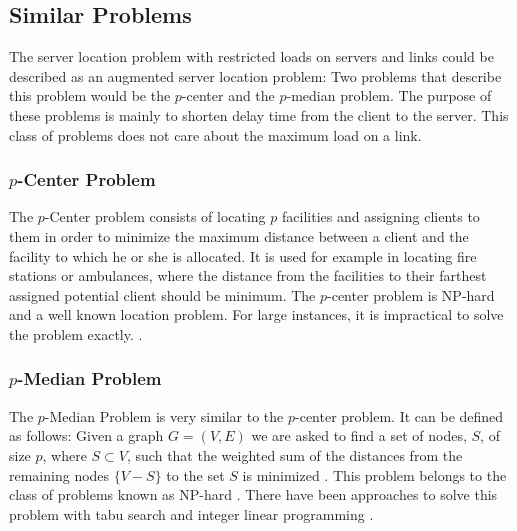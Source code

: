 \documentclass [12pt]{article}
\begin{document}
\subsection {Similar Problems}
The server location problem with restricted loads on servers and links could be described as an augmented server location problem: 
Two problems that describe this problem would be the $p$-center and the
$p$-median problem. The purpose of these problems is mainly to shorten delay
time from the client to the server. 
This class of problems does not care about the maximum load on a link.

\subsubsection {$p$-Center Problem}
The $p$-Center problem consists of locating $p$ facilities and assigning clients
to them in order to minimize the maximum distance between a client and the facility
to which he or she is allocated. It is used for example in locating fire stations or ambulances,
where the distance from the facilities 
to their farthest assigned potential client should be minimum.
The $p$-center problem is NP-hard and a well known location problem.
For large instances, it is impractical to solve the problem exactly.
\cite{KarivHakimi1979}.

\subsubsection {$p$-Median Problem}
The $p$-Median Problem is very similar to the $p$-center problem. It can be defined as follows:
Given a graph $G=(V,E)$ we are asked to find a set of nodes, $S$, of size $p$, where $ S\subset V$, such that the weighted
sum of the distances from the remaining nodes $\{V-S\}$ to the set $S$ is minimized \cite{Rolland1997329}.
This problem belongs to the class of problems known as NP-hard \cite{KarivHakimi1979median}. There have been
approaches to solve this problem with tabu search \cite{Rolland1997329} and integer linear programming 
\cite{rosing1979p}.


\end{document}

